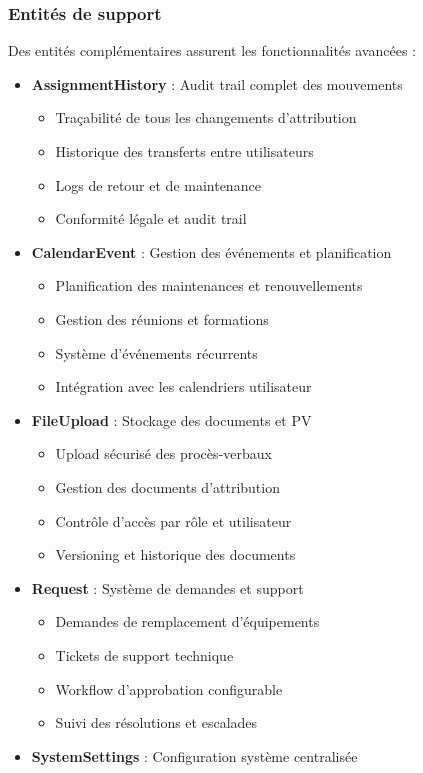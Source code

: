 \documentclass[12pt,a4paper]{report}
\begin{document}
\subsubsection{Entités de support}
Des entités complémentaires assurent les fonctionnalités avancées :

\begin{itemize}
\item \textbf{AssignmentHistory} : Audit trail complet des mouvements

  \begin{itemize}
  \item Traçabilité de tous les changements d'attribution
  \item Historique des transferts entre utilisateurs
  \item Logs de retour et de maintenance
  \item Conformité légale et audit trail
  \end{itemize}
\item \textbf{CalendarEvent} : Gestion des événements et planification

  \begin{itemize}
  \item Planification des maintenances et renouvellements
  \item Gestion des réunions et formations
  \item Système d'événements récurrents
  \item Intégration avec les calendriers utilisateur
  \end{itemize}
\item \textbf{FileUpload} : Stockage des documents et PV

  \begin{itemize}
  \item Upload sécurisé des procès-verbaux
  \item Gestion des documents d'attribution
  \item Contrôle d'accès par rôle et utilisateur
  \item Versioning et historique des documents
  \end{itemize}
\item \textbf{Request} : Système de demandes et support

  \begin{itemize}
  \item Demandes de remplacement d'équipements
  \item Tickets de support technique
  \item Workflow d'approbation configurable
  \item Suivi des résolutions et escalades
  \end{itemize}
\item \textbf{SystemSettings} : Configuration système centralisée


\end{itemize}
\end{document}
